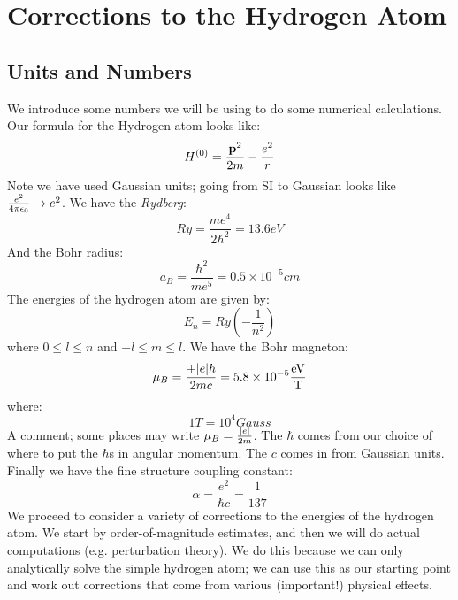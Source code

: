 \section{Corrections to the Hydrogen Atom}
\subsection{Units and Numbers}
We introduce some numbers we will be using to do some numerical calculations. Our formula for the Hydrogen atom looks like:
\begin{equation}
    H^{(0)} = \frac{\v{p}^2}{2m} - \frac{e^2}{r}
\end{equation}
Note we have used Gaussian units; going from SI to Gaussian looks like $\frac{e^2}{4\pi\e_0} \to e^2$. We have the \emph{Rydberg}:
\begin{equation}
    \si{Ry} = \frac{me^4}{2\hbar^2} = 13.6\si{eV}
\end{equation}
And the Bohr radius:
\begin{equation}
    a_B = \frac{\hbar^2}{me^5} = 0.5 \times 10^{-5}\si{cm}
\end{equation}
The energies of the hydrogen atom are given by:
\begin{equation}
    E_n = \si{Ry}\left(-\frac{1}{n^2}\right)
\end{equation}
where $0 \leq l \leq n$ and $-l \leq m \leq l$. We have the Bohr magneton:
\begin{equation}
    \mu_B = \frac{+\abs{e}\hbar}{2mc} = 5.8 \times 10^{-5}\frac{\si{eV}}{\si{T}}
\end{equation}
where:
\begin{equation}
    1\si{T} = 10^4\si{Gauss}
\end{equation}
A comment; some places may write $\mu_B = \frac{\abs{e}}{2m}$. The $\hbar$ comes from our choice of where to put the $\hbar$s in angular momentum. The $c$ comes in from Gaussian units. Finally we have the fine structure coupling constant:
\begin{equation}
    \alpha = \frac{e^2}{\hbar c} = \frac{1}{137}
\end{equation}
We proceed to consider a variety of corrections to the energies of the hydrogen atom. We start by order-of-magnitude estimates, and then we will do actual computations (e.g. perturbation theory). We do this because we can only analytically solve the simple hydrogen atom; we can use this as our starting point and work out corrections that come from various (important!) physical effects.

